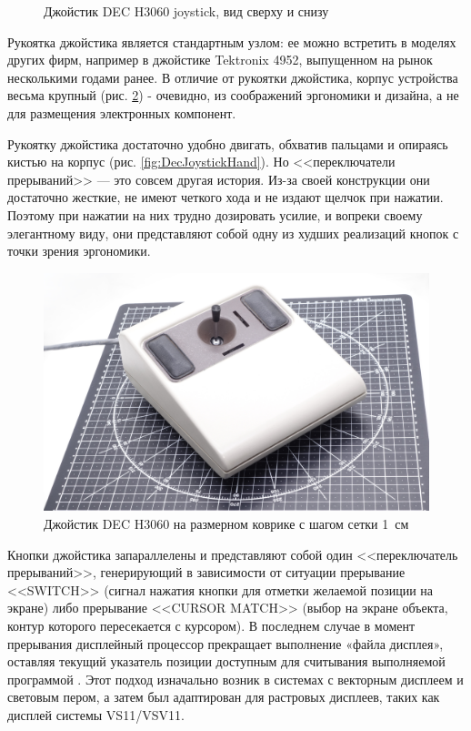 \documentclass[11pt, a4paper]{article}
\begin{document}
\begin{figure}[h]
    \caption{Джойстик DEC H3060 joystick, вид сверху и снизу}
    \label{fig:DecJoystickTopAndBottom}
\end{figure}

Рукоятка джойстика является стандартным узлом: ее можно встретить в моделях других фирм, например в джойстике Tektronix 4952, выпущенном на рынок несколькими годами ранее. В отличие от рукоятки джойстика,  корпус устройства весьма крупный (рис. \ref{fig:DecJoystickSize}) - очевидно, из соображений эргономики и дизайна, а не для размещения электронных компонент.

Рукоятку джойстика достаточно удобно двигать, обхватив пальцами и опираясь кистью на корпус (рис. \ref{fig:DecJoystickHand}). Но <<переключатели прерываний>> --- это совсем другая история. Из-за своей конструкции они достаточно жесткие, не имеют четкого хода и не издают щелчок при нажатии. Поэтому при нажатии на них трудно дозировать усилие, и вопреки своему элегантному виду, они представляют собой одну из худших реализаций кнопок с точки зрения эргономики.

\begin{figure}[h]
    \centering
    \includegraphics[scale=0.35]{1978_dec_h3060_joystick/size_30.jpg}
    \caption{Джойстик DEC H3060 на размерном коврике с шагом сетки 1~см}
    \label{fig:DecJoystickSize}
\end{figure}

Кнопки джойстика запараллелены и представляют собой один <<переключатель прерываний>>, генерирующий в зависимости от ситуации прерывание <<SWITCH>> (сигнал нажатия кнопки для отметки желаемой позиции на экране) либо прерывание <<CURSOR MATCH>> (выбор на экране объекта, контур которого пересекается с курсором). В последнем случае в момент прерывания дисплейный процессор прекращает выполнение «файла дисплея», оставляя текущий указатель позиции доступным для считывания выполняемой программой \cite{vsv11}. Этот подход изначально возник в системах с векторным дисплеем и световым пером, а затем был адаптирован для растровых дисплеев, таких как дисплей системы VS11/VSV11.
\end{document}
